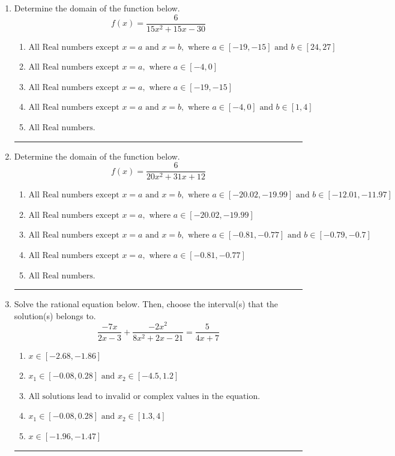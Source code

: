 \documentclass[14pt]{extbook}
\newcommand{\litem}[1]{\item#1\hspace*{-1cm}\rule{\textwidth}{0.4pt}}
\begin{document}
\begin{enumerate}
\litem{
Determine the domain of the function below.\[ f(x) = \frac{6}{15x^{2} +15 x -30} \]\begin{enumerate}[label=\Alph*.]
\item \( \text{All Real numbers except } x = a \text{ and } x = b, \text{ where } a \in [-19, -15] \text{ and } b \in [24, 27] \)
\item \( \text{All Real numbers except } x = a, \text{ where } a \in [-4, 0] \)
\item \( \text{All Real numbers except } x = a, \text{ where } a \in [-19, -15] \)
\item \( \text{All Real numbers except } x = a \text{ and } x = b, \text{ where } a \in [-4, 0] \text{ and } b \in [1, 4] \)
\item \( \text{All Real numbers.} \)

\end{enumerate} }
\litem{
Determine the domain of the function below.\[ f(x) = \frac{6}{20x^{2} +31 x + 12} \]\begin{enumerate}[label=\Alph*.]
\item \( \text{All Real numbers except } x = a \text{ and } x = b, \text{ where } a \in [-20.02, -19.99] \text{ and } b \in [-12.01, -11.97] \)
\item \( \text{All Real numbers except } x = a, \text{ where } a \in [-20.02, -19.99] \)
\item \( \text{All Real numbers except } x = a \text{ and } x = b, \text{ where } a \in [-0.81, -0.77] \text{ and } b \in [-0.79, -0.7] \)
\item \( \text{All Real numbers except } x = a, \text{ where } a \in [-0.81, -0.77] \)
\item \( \text{All Real numbers.} \)

\end{enumerate} }
\litem{
Solve the rational equation below. Then, choose the interval(s) that the solution(s) belongs to.\[ \frac{-7x}{2x -3} + \frac{-2x^{2}}{8x^{2} +2 x -21} = \frac{5}{4x + 7} \]\begin{enumerate}[label=\Alph*.]
\item \( x \in [-2.68,-1.86] \)
\item \( x_1 \in [-0.08, 0.28] \text{ and } x_2 \in [-4.5,1.2] \)
\item \( \text{All solutions lead to invalid or complex values in the equation.} \)
\item \( x_1 \in [-0.08, 0.28] \text{ and } x_2 \in [1.3,4] \)
\item \( x \in [-1.96,-1.47] \)


\end{enumerate}}
\end{enumerate}
\end{document}
